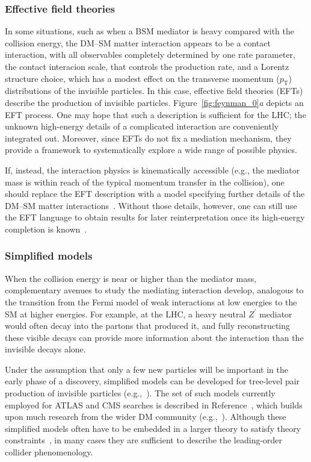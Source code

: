 \documentclass{ar-1col}
\newcommand{\IP}{invisible particle}
\newcommand{\pt}{\ensuremath{p_\mathrm{T}}\xspace}
\newcommand{\Zprime}{\ensuremath{{Z}^\prime}\xspace}
\begin{document}
\subsubsection{Effective field theories}\label{sub:EFT}

In some situations, such as when a BSM mediator is heavy compared
with the collision energy, the DM--SM matter interaction appears to be a
contact interaction, with all observables completely determined by
one rate parameter, the contact interacion scale, that controls
the production rate, and a Lorentz structure choice, which has a
modest effect on the transverse momentum (\pt) distributions of the
{\IP}s. In this case, effective field theories
(EFTs)~\cite{Beltran:2010ww,Goodman:2010ku,Bai:2010hh,Fox:2011pm} describe the production of {\IP}s. Figure~\ref{fig:feynman_0}\textit{a} depicts an EFT
process. One may
hope that such a description is sufficient for the LHC; the
unknown high-energy details of a complicated interaction are
conveniently integrated out. Moreover, since EFTs do not fix a
mediation mechanism, they provide a framework to systematically
explore a wide range of possible physics.

If, instead, the interaction physics is kinematically accessible
(e.g., the mediator mass is within reach of the typical momentum
transfer in the collision), one should replace the EFT description
with a model specifying further details of the DM--SM matter
interactions~\cite{Shoemaker:2011vi}. Without those details,
however, one can still use the EFT language to obtain results for
later reinterpretation once its high-energy completion is known~\cite{Racco:2015dxa,Busoni:2013lha}.

\subsubsection{Simplified models}\label{sub:simplifiedModels}

When the collision energy is near or higher than the mediator
mass, complementary avenues to study the mediating interaction
develop, analogous to the transition from the Fermi model of weak
interactions at low energies to the SM at higher
energies. For example, at the LHC, a heavy neutral \Zprime
mediator would often decay into the partons that produced it, and
fully reconstructing these visible decays can provide more
information about the interaction than the invisible decays alone.

Under the assumption that only a few new particles
will be important in the early phase of a discovery, simplified
models can be developed for tree-level pair production of {\IP}s
(e.g.,~). The set of such models
currently employed for ATLAS and CMS searches is described in
Reference~, which builds upon much research from
the wider DM community
(e.g.,~). Although these simplified
models often have to be embedded in a larger theory to satisfy theory
constraints~\cite{Kahlhoefer:2015bea}, in many cases they are sufficient to
describe the leading-order collider phenomenology.
\end{document}

